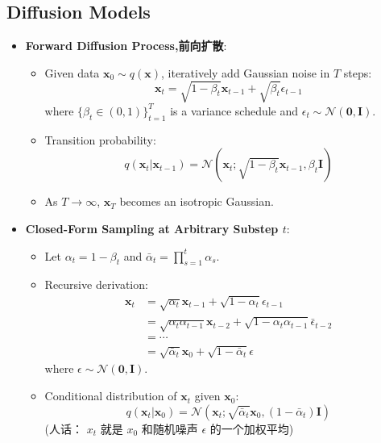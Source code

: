 \documentclass[UTF8]{ctexart}
\begin{document}
\subsection{Diffusion Models}
\begin{itemize}
    \item \textbf{Forward Diffusion Process,前向扩散}:
    \begin{itemize}
        \item Given data $\mathbf{x}_0 \sim q(\mathbf{x})$, iteratively add Gaussian noise in $T$ steps:
        $$\mathbf{x}_t = \sqrt{1 - \beta_t}\mathbf{x}_{t-1} + \sqrt{\beta_t}\epsilon_{t-1}$$
        where $\{\beta_t \in (0,1)\}_{t=1}^T$ is a variance schedule and $\epsilon_t \sim \mathcal{N}(\mathbf{0}, \mathbf{I})$.
        \item Transition probability:
        $$q(\mathbf{x}_t|\mathbf{x}_{t-1}) = \mathcal{N}(\mathbf{x}_t; \sqrt{1 - \beta_t}\mathbf{x}_{t-1}, \beta_t\mathbf{I})$$
        \item As $T \to \infty$, $\mathbf{x}_T$ becomes an isotropic Gaussian.
    \end{itemize}
    
    \item \textbf{Closed-Form Sampling at Arbitrary Substep $t$}:
    \begin{itemize}
        \item Let $\alpha_t = 1 - \beta_t$ and $\bar{\alpha}_t = \prod_{s=1}^t \alpha_s$.
        \item Recursive derivation:
        \begin{align*}
            \mathbf{x}_t &= \sqrt{\alpha_t}\mathbf{x}_{t-1} + \sqrt{1 - \alpha_t}\epsilon_{t-1} \\
            &= \sqrt{\alpha_t\alpha_{t-1}}\mathbf{x}_{t-2} + \sqrt{1 - \alpha_t\alpha_{t-1}}\bar{\epsilon}_{t-2} \\
            &= \cdots \\
            &= \sqrt{\bar{\alpha}_t}\mathbf{x}_0 + \sqrt{1 - \bar{\alpha}_t}\epsilon
        \end{align*}
        where $\epsilon \sim \mathcal{N}(\mathbf{0}, \mathbf{I})$.
        \item Conditional distribution of $\mathbf{x}_t$ given $\mathbf{x}_0$:
        $$q(\mathbf{x}_t|\mathbf{x}_0) = \mathcal{N}(\mathbf{x}_t; \sqrt{\bar{\alpha}_t}\mathbf{x}_0, (1 - \bar{\alpha}_t)\mathbf{I})$$
    (人话： $x_t$ 就是 $x_0$ 和随机噪声 $\epsilon$ 的一个加权平均)
    \end{itemize}


\end{itemize}
\end{document}
